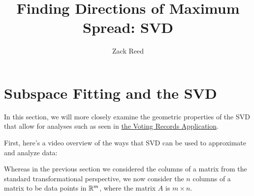 \documentclass{ximera}
\author{Zack Reed}
\title{Finding Directions of Maximum Spread: SVD}
\begin{document}
\begin{abstract}

\end{abstract}
\maketitle


\section*{Subspace Fitting and the SVD}


In this section, we will more closely examine the geometric properties of the SVD that allow for analyses such as seen in \href{https://ximera.osu.edu/appliedlinearalgebra/c6ChapterSix/learningActivities/m6LearningActivities/leastSquares/leastSquaresApplicationVotingImages}{the Voting Records Application}.

First, here's a video overview of the ways that SVD can be used to approximate and analyze data:

\begin{center}
\end{center}

Whereas in the previous section we considered the columns of a matrix from the standard transformational perspective, we now consider the $n$ columns of a matrix to be data points in $\mathbb{R}^m$, where the matrix $A$ is $m\times n$. 
\end{document}
